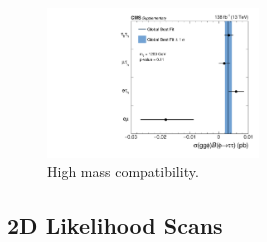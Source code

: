 \begin{figure}[!hbtp]
\centering
    \includegraphics[width=0.5\textwidth]{Figures/ccc_fit_result_mH1200_per-channel.pdf}
\caption{High mass compatibility.}
\label{fig:high_mass_compatibility}
\end{figure}

\subsection{2D Likelihood Scans}

